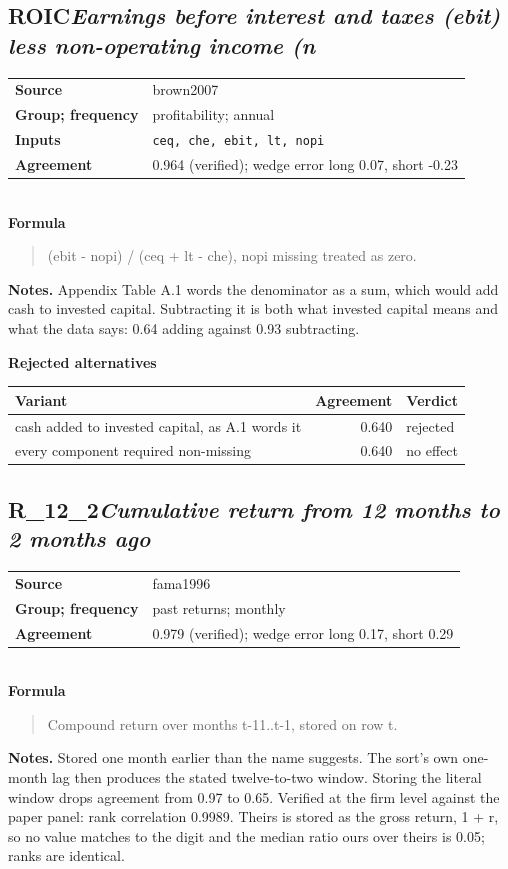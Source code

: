 \documentclass[11pt]{article}
\begin{document}
\subsection*{ROIC\quad\normalfont\itshape Earnings before interest and taxes (ebit) less non-operating income (n}
\begin{tabular}{@{}p{3.3cm}p{12.3cm}@{}}
\textbf{Source} & brown2007\\
\textbf{Group; frequency} & profitability; annual\\
\textbf{Inputs} & \texttt{ceq, che, ebit, lt, nopi}\\
\textbf{Agreement} & 0.964 (verified); wedge error long 0.07, short -0.23\\
\end{tabular}\\[4pt]
\textbf{Formula}
\begin{quote}\small
(ebit - nopi) / (ceq + lt - che), nopi missing treated as zero.\\

\end{quote}
\textbf{Notes.} Appendix Table A.1 words the denominator as a sum, which would add cash to
invested capital. Subtracting it is both what invested capital means and what
the data says: 0.64 adding against 0.93 subtracting.

\textbf{Rejected alternatives}\\[2pt]
{\small\begin{longtable}{@{}p{9.6cm}rp{4.3cm}@{}}
\toprule Variant & Agreement & Verdict\\\midrule\endhead
cash added to invested capital, as A.1 words it & 0.640 & rejected\\
every component required non-missing & 0.640 & no effect\\
\bottomrule\end{longtable}}
\subsection*{R\_12\_2\quad\normalfont\itshape Cumulative return from 12 months to 2 months ago}
\begin{tabular}{@{}p{3.3cm}p{12.3cm}@{}}
\textbf{Source} & fama1996\\
\textbf{Group; frequency} & past returns; monthly\\
\textbf{Agreement} & 0.979 (verified); wedge error long 0.17, short 0.29\\
\end{tabular}\\[4pt]
\textbf{Formula}
\begin{quote}\small
Compound return over months t-11..t-1, stored on row t.\\

\end{quote}
\textbf{Notes.} Stored one month earlier than the name suggests. The sort's own one-month lag
then produces the stated twelve-to-two window. Storing the literal window drops
agreement from 0.97 to 0.65. Verified at the firm level against the paper panel: rank correlation 0.9989. Theirs is stored as the gross return, 1 + r, so no value matches to the digit and the median ratio ours over theirs is 0.05; ranks are identical.
\end{document}
